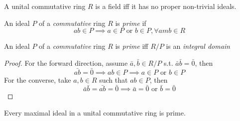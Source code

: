 \begin{corollary}
A unital commutative ring $R$ is a field iff it has no proper non-trivial ideals.
\end{corollary}

\begin{definition}[Prime]
An ideal $P$ of a \emph{commutative} ring $R$ is \emph{prime} if
\[
ab\in P\implies a\in P\mbox{ or }b\in P,\forall amb\in R
\]
\end{definition}
\begin{theorem}
An ideal $P$ of a \emph{commutative} ring $R$ is \emph{prime} iff $R/P$ is an \emph{integral domain}
\end{theorem}
\begin{proof}
For the forward direction, assume $\bar{a},\bar{b}\in R/P$ s.t. $\bar{a}\bar{b}=\bar0$, then
\[
\bar{ab}=\bar0\implies ab\in P\implies a\in P\mbox{ or }b\in P
\]
For the converse, take $a,b\in R$ such that $ab\in P$, then
\[
\bar{a}\bar{b}=\bar{ab}=\bar0\implies \bar a=\bar0\mbox{ or }\bar b=\bar 0
\]
\end{proof}
\begin{corollary}
Every maximal ideal in a unital commutative ring is prime.
\end{corollary}

